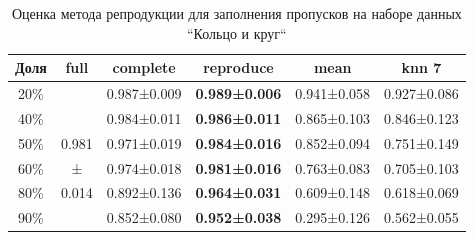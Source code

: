 \begin{table} [htbp]
    \centering
    \begin{threeparttable}
        \caption{Оценка метода репродукции для заполнения пропусков на наборе данных ``Кольцо и круг``}\label{tab:missing_results_circle}
        \begin{SingleSpace}
        \begin{tabular}{|c|c|c|c|c|c|}
            \hline
            Доля & full & complete & reproduce & mean & knn 7 \\
            \hline
            20\% &       & 0.987±0.009 & \textbf{0.989±0.006} & 0.941±0.058 & 0.927±0.086 \\
            40\% &       & 0.984±0.011 & \textbf{0.986±0.011} & 0.865±0.103 & 0.846±0.123 \\
            50\% & 0.981 & 0.971±0.019 & \textbf{0.984±0.016} & 0.852±0.094 & 0.751±0.149 \\
            60\% &   ±   & 0.974±0.018 & \textbf{0.981±0.016} & 0.763±0.083 & 0.705±0.103 \\
            80\% & 0.014 & 0.892±0.136 & \textbf{0.964±0.031} & 0.609±0.148 & 0.618±0.069 \\
            90\% &       & 0.852±0.080 & \textbf{0.952±0.038} & 0.295±0.126 & 0.562±0.055 \\
            \hline
        \end{tabular}
        \end{SingleSpace}
    \end{threeparttable}
\end{table}